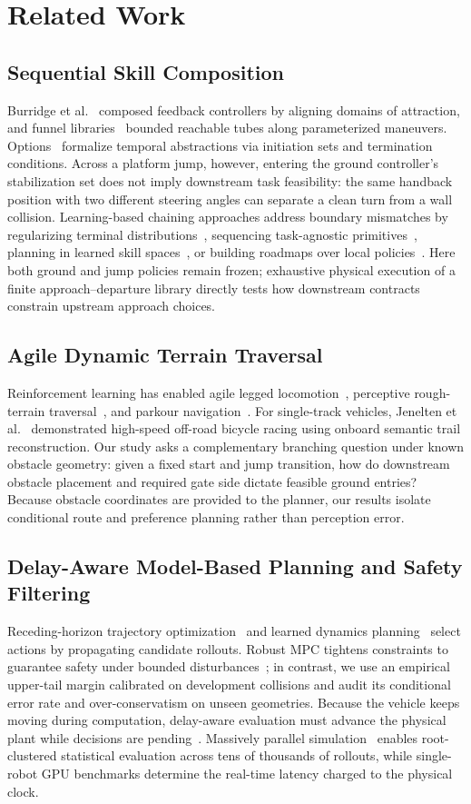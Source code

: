 \documentclass[letterpaper,10pt,conference]{ieeeconf}
\begin{document}
\section{Related Work}
\subsection{Sequential Skill Composition}
Burridge et al.~\cite{burridge} composed feedback controllers by aligning domains of attraction, and funnel libraries~\cite{funnel} bounded reachable tubes along parameterized maneuvers. Options~\cite{options} formalize temporal abstractions via initiation sets and termination conditions. Across a platform jump, however, entering the ground controller's stabilization set does not imply downstream task feasibility: the same handback position with two different steering angles can separate a clean turn from a wall collision. Learning-based chaining approaches address boundary mismatches by regularizing terminal distributions~\cite{chain}, sequencing task-agnostic primitives~\cite{stap}, planning in learned skill spaces~\cite{skimo}, or building roadmaps over local policies~\cite{prm}. Here both ground and jump policies remain frozen; exhaustive physical execution of a finite approach--departure library directly tests how downstream contracts constrain upstream approach choices.

\subsection{Agile Dynamic Terrain Traversal}
Reinforcement learning has enabled agile legged locomotion~\cite{hwangbo}, perceptive rough-terrain traversal~\cite{miki}, and parkour navigation~\cite{parkour}. For single-track vehicles, Jenelten et al.~\cite{trail} demonstrated high-speed off-road bicycle racing using onboard semantic trail reconstruction. Our study asks a complementary branching question under known obstacle geometry: given a fixed start and jump transition, how do downstream obstacle placement and required gate side dictate feasible ground entries? Because obstacle coordinates are provided to the planner, our results isolate conditional route and preference planning rather than perception error.

\subsection{Delay-Aware Model-Based Planning and Safety Filtering}
Receding-horizon trajectory optimization~\cite{tassa} and learned dynamics planning~\cite{pets,yang} select actions by propagating candidate rollouts. Robust MPC tightens constraints to guarantee safety under bounded disturbances~\cite{tube}; in contrast, we use an empirical upper-tail margin calibrated on development collisions and audit its conditional error rate and over-conservatism on unseen geometries. Because the vehicle keeps moving during computation, delay-aware evaluation must advance the physical plant while decisions are pending~\cite{delay}. Massively parallel simulation~\cite{rudin} enables root-clustered statistical evaluation across tens of thousands of rollouts, while single-robot GPU benchmarks determine the real-time latency charged to the physical clock.
\end{document}
